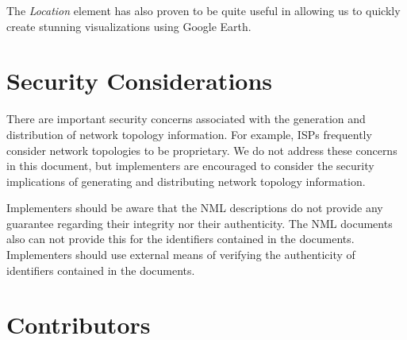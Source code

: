 \documentclass[12pt]{article}  %
\begin{document}
 The \emph{Location} element has also proven to be quite useful in allowing 
us to quickly create stunning visualizations using Google Earth.


% 
% 
% 
% 

\section{Security Considerations} %
\label{sec:security_considerations}


There are important security concerns associated with the generation and distribution of network topology information. For example, ISPs frequently consider network topologies to be proprietary. We do not address these concerns in this document, but implementers are encouraged to consider the security implications of generating and distributing network topology information. 

Implementers should be aware that the NML descriptions do not provide any guarantee regarding their integrity nor their authenticity. The NML documents also can not provide this for the identifiers contained in the documents. Implementers should use external means of verifying the authenticity of identifiers contained in the documents.

\section{Contributors}
\end{document}

